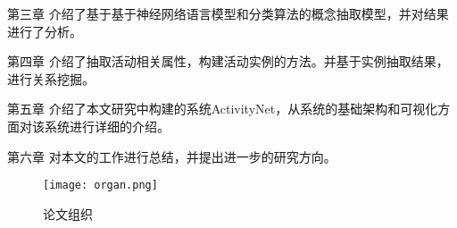 {\heiti 第三章} 介绍了基于基于神经网络语言模型和分类算法的概念抽取模型，并对结果进行了分析。

{\heiti 第四章} 介绍了抽取活动相关属性，构建活动实例的方法。并基于实例抽取结果，进行关系挖掘。

{\heiti 第五章} 介绍了本文研究中构建的系统ActivityNet，从系统的基础架构和可视化方面对该系统进行详细的介绍。

{\heiti 第六章} 对本文的工作进行总结，并提出进一步的研究方向。

\begin{figure}[!h]
\caption{论文组织}
\label{fig:organ}
\begin{center}
\texttt{[image: organ.png]}
\end{center}
\end{figure}

